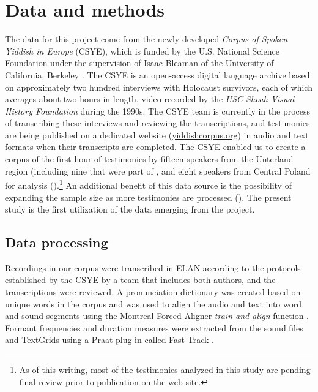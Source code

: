 \documentclass[output=paper,colorlinks,citecolor=brown]{langscibook}
\begin{document}
\section{Data and methods}
\label{sec:nove:4}
The data for this project come from the newly developed \textit{Corpus of Spoken Yiddish in Europe} (CSYE), which is funded by the U.S. National Science Foundation under the supervision of Isaac Bleaman of the University of California, Berkeley \citep{BleamanNovePress}. The CSYE is an open-access digital language archive based on approximately two hundred interviews with Holocaust survivors, each of which averages about two hours in length, video-recorded by the \textit{USC Shoah Visual History Foundation} during the 1990s. The CSYE team is currently in the process of transcribing these interviews and reviewing the transcriptions, and testimonies are being published on a dedicated website (\href{http://yiddishcorpus.org/}{{yiddishcorpus.org}}) in audio and text formats when their transcripts are completed. The CSYE enabled us to create a corpus of the first hour of testimonies by fifteen speakers from the Unterland region (including nine that were part of \citet{Nove2021}, and eight speakers from Central Poland for analysis (\citealt{Archive2022a,Archive2022b}).\footnote{As of this writing, most of the testimonies analyzed in this study are pending final review prior to publication on the web site.} An additional benefit of this data source is the possibility of expanding the sample size as more testimonies are processed (\citealt{Nove2023,NoveSadock}). The present study is the first utilization of the data emerging from the project.

\subsection{Data processing}
\label{sec:nove:4.1}

Recordings in our corpus were transcribed in ELAN according to the protocols established by the CSYE by a team that includes both authors, and the transcriptions were reviewed. A pronunciation dictionary was created based on unique words in the corpus and was used to align the audio and text into word and sound segments using the Montreal Forced Aligner \textit{train and align} function \citep{McAuliffeEtAl2017}. Formant frequencies and duration measures were extracted from the sound files and TextGrids using a Praat plug-in called Fast Track \citep{Barreda2021}. 
\end{document}

